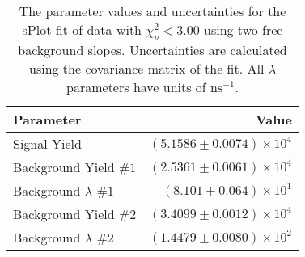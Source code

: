 
\begin{table}[ht]
    \begin{center}
        \begin{tabular}{lr}\toprule
            Parameter & Value \\\midrule
            Signal Yield & $(5.1586 \pm 0.0074) \times 10^{4}$ \\
            Background Yield $\#1$ & $(2.5361 \pm 0.0061) \times 10^{4}$ \\
            Background $\lambda$ $\#1$ & $(8.101 \pm 0.064) \times 10^{1}$ \\
            Background Yield $\#2$ & $(3.4099 \pm 0.0012) \times 10^{4}$ \\
            Background $\lambda$ $\#2$ & $(1.4479 \pm 0.0080) \times 10^{2}$ \\\bottomrule
        \end{tabular}
        \caption{The parameter values and uncertainties for the sPlot fit of data with $\chi^2_\nu < 3.00$ using two free background slopes. Uncertainties are calculated using the covariance matrix of the fit. All $\lambda$ parameters have units of $\si{\nano\second}^{-1}$.}\label{tab:splot-fit-results-chisqdof-3.00-free-2}
    \end{center}
\end{table}
